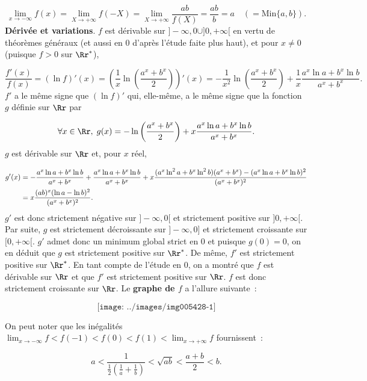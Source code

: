 {{$$\lim_{x\rightarrow -\infty}f(x)=\lim_{X\rightarrow +\infty}f(-X)=\lim_{X\rightarrow +\infty}\frac{ab}{f(X)}=\frac{ab}{b}=a\quad(=\mbox{Min}\{a,b\}).$$
\textbf{Dérivée et variations}.
$f$ est dérivable sur $]-\infty,0\cup]0,+\infty[$ en vertu de théorèmes généraux (et aussi en $0$ d'après l'étude faite plus haut), et pour $x\neq0$ (puisque $f>0$ sur $\Rr^*$),

$$\frac{f'(x)}{f(x)}=(\ln f)'(x)=\left(\frac{1}{x}\ln\left(\frac{a^x+b^x}{2}\right)\right)'(x)=-\frac{1}{x^2}\ln\left(\frac{a^x+b^x}{2}\right)+\frac{1}{x}
\frac{a^x\ln a+b^x\ln b}{a^x+b^x}.$$
$f'$ a le même signe que $(\ln f)'$ qui, elle-même, a le même signe que la fonction $g$ définie sur $\Rr$ par

$$\forall x\in\Rr,\;g(x)=-\ln\left(\frac{a^x+b^x}{2}\right)+x\frac{a^x\ln a+b^x\ln b}{a^x+b^x}.$$
$g$ est dérivable sur $\Rr$ et, pour $x$ réel,

\begin{align*}\ensuremath
g'(x)&=-\frac{a^x\ln a+b^x\ln b}{a^x+b^x}+\frac{a^x\ln a+b^x\ln b}{a^x+b^x}+x\frac{(a^x\ln^2a+b^x\ln^2b)(a^x+b^x)-(a^x\ln a+b^x\ln b)^2}{(a^x+b^x)^2}\\
 &=x\frac{(ab)^x(\ln a-\ln b)^2}{(a^x+b^x)^2}.
\end{align*}
$g'$ est donc strictement négative sur $]-\infty,0[$ et strictement positive sur $]0,+\infty[$. Par suite, $g$ est strictement décroissante sur $]-\infty,0]$ et strictement croissante sur $[0,+\infty[$. $g'$ admet donc un minimum global strict en $0$ et puisque $g(0)=0$, on en déduit que $g$ est strictement positive sur $\Rr^*$. De même, $f'$ est strictement positive sur $\Rr^*$. En tant compte de l'étude en $0$, on a montré que $f$ est dérivable sur $\Rr$ et que $f'$ est strictement positive sur $\Rr$. $f$ est donc strictement croissante sur $\Rr$.
Le \textbf{graphe de $f$} a l'allure suivante~:

$$\texttt{[image: ../images/img005428-1]}$$

On peut noter que les inégalités $\lim_{x\rightarrow -\infty}f<f(-1)<f(0)<f(1)<\lim_{x\rightarrow +\infty}f$ fournissent~:

$$a<\frac{1}{\frac{1}{2}(\frac{1}{a}+\frac{1}{b})}<\sqrt{ab}<\frac{a+b}{2}<b.$$
}
}
